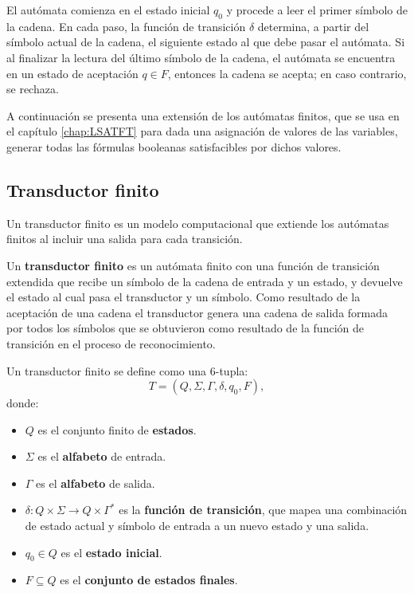 El autómata comienza en el estado inicial $q_0$ y procede a leer el primer símbolo de la cadena.  En cada paso, la función de transición $\delta$ determina, a partir del símbolo actual de la cadena, el siguiente estado al que debe pasar el autómata.  Si al finalizar la lectura del último símbolo de la cadena, el autómata se encuentra en un estado de aceptación $q \in F$, entonces la cadena se acepta; en caso contrario, se rechaza.

A continuación se presenta una extensión de los autómatas finitos, que se usa en el capítulo \ref{chap:LSATFT} para dada una asignación de valores de las variables, generar todas las fórmulas booleanas satisfacibles por dichos valores.

\subsection{Transductor finito}

Un transductor finito \cite{finite_transducer} es un modelo computacional que extiende los autómatas finitos al incluir una salida para cada transición.

\begin{definition}
  Un \textbf{transductor finito} es un autómata finito con una función de transición extendida que recibe un símbolo de la cadena de entrada y un estado, y devuelve el estado al cual pasa el transductor y un símbolo.  Como resultado de la aceptación de una cadena el transductor genera una cadena de salida formada por todos los símbolos que se obtuvieron como resultado de la función de transición en el proceso de reconocimiento.
  
  Un transductor finito se define como una 6-tupla:
  \[
    T = (Q, \Sigma, \Gamma, \delta, q_0, F),
  \]
  donde:
  \begin{itemize}
    \item \(Q\) es el conjunto finito de \textbf{estados}.
    \item \(\Sigma\) es el \textbf{alfabeto} de entrada.
    \item \(\Gamma\) es el \textbf{alfabeto} de salida.
    \item \(\delta: Q \times \Sigma \to Q \times \Gamma^*\) es la \textbf{función de transición}, que mapea una combinación de estado actual y símbolo de entrada a un nuevo estado y una salida.
    \item \(q_0 \in Q\) es el \textbf{estado inicial}.
    \item \(F \subseteq Q\) es el \textbf{conjunto de estados finales}.
  \end{itemize}
\end{definition}


